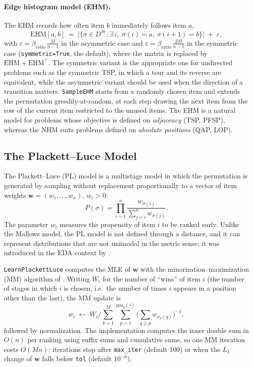 \documentclass[a4paper,11pt]{article}
\begin{document}
\paragraph{Edge histogram model (EHM).}
The EHM records how often item $b$ immediately follows item $a$,
\begin{equation}
\mathrm{EHM}[a,b] \;=\;
   \big|\{\sigma \in D^{Se} : \exists\, i,\; \sigma(i)=a,\ \sigma(i+1)=b\}\big|
   \;+\; \varepsilon ,
\end{equation}
with $\varepsilon = \beta_{\text{ratio}}\,\frac{M}{n-1}$ in the asymmetric case
and $\varepsilon = \beta_{\text{ratio}}\,\frac{2M}{n-1}$ in the symmetric case
(\texttt{symmetric=True}, the default), where the matrix is replaced by
$\mathrm{EHM}+\mathrm{EHM}^\top$.  The symmetric variant is the appropriate one
for undirected problems such as the symmetric TSP, in which a tour and its
reverse are equivalent, while the asymmetric variant should be used when the
direction of a transition matters.  \texttt{SampleEHM} starts from a randomly
chosen item and extends the permutation greedily-at-random, at each step drawing
the next item from the row of the current item restricted to the unused items.
The EHM is a natural model for problems whose objective is defined on
\emph{adjacency} (TSP, PFSP), whereas the NHM suits problems defined on
\emph{absolute positions} (QAP, LOP).

\subsection{The Plackett--Luce Model}

The Plackett--Luce (PL) model \citep{Luce:1959,Plackett:1975} is a multistage
model in which the permutation is generated by sampling without replacement
proportionally to a vector of item weights $\mathbf{w} = (w_1,\ldots,w_n)$,
$w_i > 0$:
\begin{equation}
P(\sigma) = \prod_{i=1}^{n}
  \frac{w_{\sigma(i)}}{\sum_{j=i}^{n} w_{\sigma(j)}} .
\label{eq:pl}
\end{equation}
The parameter $w_i$ measures the propensity of item $i$ to be ranked early.
Unlike the Mallows model, the PL model is not defined through a distance, and it
can represent distributions that are not unimodal in the metric sense; it was
introduced in the EDA context by \cite{Ceberio_et_al:2013}.

\texttt{LearnPlackettLuce} computes the MLE of $\mathbf{w}$ with the
minorization--maximization (MM) algorithm of \cite{Hunter:2004}.  Writing $W_i$
for the number of ``wins'' of item $i$ (the number of stages in which $i$ is
chosen, i.e.\ the number of times $i$ appears in a position other than the last),
the MM update is
\begin{equation}
w_i \;\leftarrow\;
  W_i \Big/ \sum_{k=1}^{M} \sum_{p=1}^{\mathrm{pos}_k(i)}
  \Big(\sum_{q \geq p} w_{\sigma_k(q)}\Big)^{-1} ,
\end{equation}
followed by normalization.  The implementation computes the inner double sum in
$O(n)$ per ranking using suffix sums and cumulative sums, so one MM iteration
costs $O(Mn)$; iterations stop after \texttt{max\_iter} (default 100) or when the
$L_1$ change of $\mathbf{w}$ falls below \texttt{tol} (default $10^{-6}$).
\end{document}
